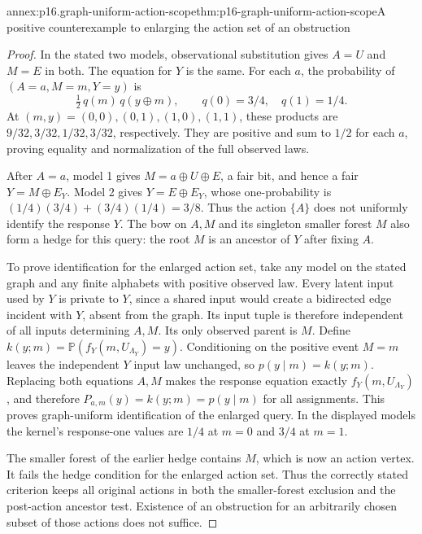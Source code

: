 \begin{annexitem}{annex:p16.graph-uniform-action-scope}{thm:p16-graph-uniform-action-scope}{A positive counterexample to enlarging the action set of an obstruction}
\begin{proof}
In the stated two models, observational substitution gives \(A=U\)
and \(M=E\) in both. The equation for \(Y\) is the same.
For each \(a\), the probability of \((A=a,M=m,Y=y)\) is
\[
 \tfrac12\,q(m)\,q(y\oplus m),\qquad q(0)=3/4,\quad q(1)=1/4.
\]
At \((m,y)=(0,0),(0,1),(1,0),(1,1)\), these products are
\(9/32,3/32,1/32,3/32\), respectively. They are positive
and sum to \(1/2\) for each \(a\), proving equality and
normalization of the full observed laws.

After \(A=a\), model 1 gives
\(M=a\oplus U\oplus E\), a fair bit, and hence a fair
\(Y=M\oplus E_Y\). Model 2 gives \(Y=E\oplus E_Y\),
whose one-probability is
\((1/4)(3/4)+(3/4)(1/4)=3/8\). Thus the action \(\{A\}\)
does not uniformly identify the response \(Y\).
The bow on \(A,M\) and its singleton smaller forest \(M\)
also form a hedge for this query: the root \(M\) is an ancestor
of \(Y\) after fixing \(A\).

To prove identification for the enlarged action set, take any model
on the stated graph and any finite alphabets with positive observed
law. Every latent input used by \(Y\) is private to \(Y\),
since a shared input would create a bidirected edge incident with
\(Y\), absent from the graph. Its input tuple is therefore
independent of all inputs determining \(A,M\). Its only observed
parent is \(M\). Define
\(k(y;m)=\mathbb P(f_Y(m,U_{\Lambda_Y})=y)\).
Conditioning on the positive event \(M=m\) leaves the independent
\(Y\) input law unchanged, so \(p(y\mid m)=k(y;m)\).
Replacing both equations \(A,M\) makes the response equation
exactly \(f_Y(m,U_{\Lambda_Y})\), and therefore
\(P_{a,m}(y)=k(y;m)=p(y\mid m)\) for all assignments.
This proves graph-uniform identification of the enlarged query.
In the displayed models the kernel's response-one values are
\(1/4\) at \(m=0\) and \(3/4\) at \(m=1\).

The smaller forest of the earlier hedge contains \(M\), which
is now an action vertex. It fails the hedge condition for the
enlarged action set. Thus the correctly stated criterion keeps
all original actions in both the smaller-forest exclusion and the
post-action ancestor test. Existence of an obstruction for an
arbitrarily chosen subset of those actions does not suffice.
\end{proof}
\end{annexitem}

